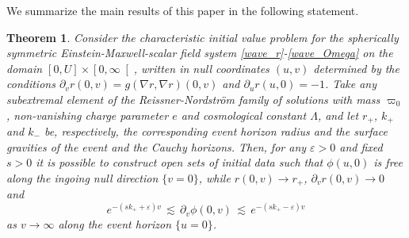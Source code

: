 \documentclass[a4paper,11pt,oneside,reqno]{amsart}
\newtheorem{Thm}{Theorem}[section]
\begin{document}
We summarize the  main results of this paper in the following statement.
\begin{Thm}
\label{thmMain}
Consider the characteristic initial value problem for the spherically symmetric Einstein-Maxwell-scalar field system \eqref{wave_r}-\eqref{wave_Omega} on the domain $[0,U] \times \left[0,\infty\right[$, written in null coordinates $(u,v)$ determined by the conditions $\partial_vr(0,v)=g(\nabla r, \nabla r)(0,v)$ and $\partial_ur(u,0)=-1$. Take any subextremal element of the Reissner-Nordstr\"{o}m family of solutions with mass $\varpi_0$, non-vanishing charge parameter $e$ and cosmological constant $\Lambda$, and let $r_+$, $k_+$ and $k_-$ be, respectively, the corresponding event horizon radius and the surface gravities of the event and the Cauchy horizons. Then, for any $\varepsilon > 0$ and  fixed $s>0$ it is possible to construct open sets of initial data such that $\phi(u,0)$ is free along the ingoing null direction $\{v=0\}$, while $r(0,v) \to r_+$, $\partial_vr(0,v) \to 0$ and
\begin{equation} \label{PriceThm}
e^{-(sk_+ + \varepsilon)v} \, \lesssim \, \partial_v\phi(0,v) \, \lesssim \, e^{-(sk_+ - \varepsilon)v}
\end{equation}
as $v \to \infty$ along the event horizon $\{u=0\}$. 


\end{Thm}
\end{document}
